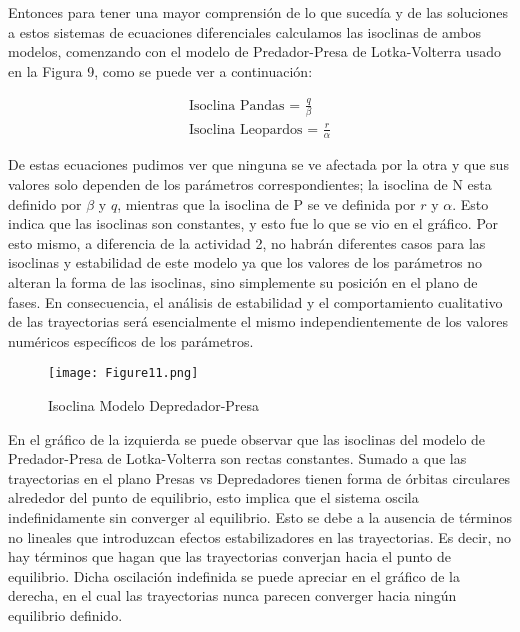 \documentclass{article}
\begin{document}
\noindent Entonces para tener una mayor comprensión de lo que sucedía y de las soluciones a estos sistemas de ecuaciones diferenciales calculamos las isoclinas de ambos modelos, comenzando con el modelo de Predador-Presa de Lotka-Volterra usado en la Figura 9, como se puede ver a continuación:
\vspace{1\baselineskip}

\begin{align*}
\text{Isoclina Pandas = } \frac{q}{\beta} \\
\text{Isoclina Leopardos = } \frac{r}{\alpha}
\end{align*}

\noindent De estas ecuaciones pudimos ver que ninguna se ve afectada por la otra y que sus valores solo dependen de los parámetros correspondientes; la isoclina de N esta definido por $\beta$ y $q$, mientras que la isoclina de P se ve definida por $r$ y $\alpha$. Esto indica que las isoclinas son constantes, y esto fue lo que se vio en el gráfico. Por esto mismo, a diferencia de la actividad 2, no habrán diferentes casos para las isoclinas y estabilidad de este modelo ya que los valores de los parámetros no alteran la forma de las isoclinas, sino simplemente su posición en el plano de fases. En consecuencia, el análisis de estabilidad y el comportamiento cualitativo de las trayectorias será esencialmente el mismo independientemente de los valores numéricos específicos de los parámetros.
\vspace{1\baselineskip}

\begin{figure}[ht]
    \centering
    \caption{Isoclina Modelo Depredador-Presa}
    \texttt{[image: Figure11.png]}
    \label{fig:Image 1.1}
\end{figure}

\vspace{1\baselineskip}

\noindent En el gráfico de la izquierda se puede observar que las isoclinas del modelo de Predador-Presa de Lotka-Volterra son rectas constantes. Sumado a que las trayectorias en el plano Presas vs Depredadores tienen forma de órbitas circulares alrededor del punto de equilibrio, esto implica que el sistema oscila indefinidamente sin converger al equilibrio. Esto se debe a la ausencia de términos no lineales que introduzcan efectos estabilizadores en las trayectorias. Es decir, no hay términos que hagan que las trayectorias converjan hacia el punto de equilibrio. Dicha oscilación indefinida se puede apreciar en el gráfico de la derecha, en el cual las trayectorias nunca parecen converger hacia ningún equilibrio definido.
\vspace{1\baselineskip}
\end{document}
